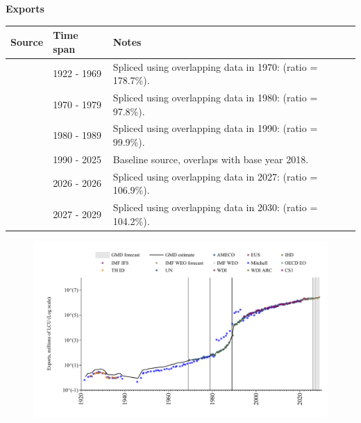 \documentclass[12pt,a4paper,landscape]{article}
\begin{document}
\begin{adjustbox}{max totalsize={\paperwidth}{\paperheight},center}
\begin{minipage}[t][\textheight][t]{\textwidth}
\vspace*{0.5cm}
{}
\begin{center}
{\Large\bfseries Exports}
\end{center}
\vspace{0.5cm}
\begin{table}[H]
\centering
\small
\begin{tabular}{|l|l|l|}
\hline
\textbf{Source} & \textbf{Time span} & \textbf{Notes} \\
\hline
\rowcolor{white}\cite{Mitchell}& 1922 - 1969 &Spliced using overlapping data in 1970: (ratio = 178.7\%). \\
\rowcolor{lightgray}\cite{UN}& 1970 - 1979 &Spliced using overlapping data in 1980: (ratio = 97.8\%). \\
\rowcolor{white}\cite{AMECO}& 1980 - 1989 &Spliced using overlapping data in 1990: (ratio = 99.9\%). \\
\rowcolor{lightgray}\cite{OECD_EO}& 1990 - 2025 &Baseline source, overlaps with base year 2018. \\
\rowcolor{white}\cite{AMECO}& 2026 - 2026 &Spliced using overlapping data in 2027: (ratio = 106.9\%). \\
\rowcolor{lightgray}\cite{IMF_WEO_forecast}& 2027 - 2029 &Spliced using overlapping data in 2030: (ratio = 104.2\%). \\
\hline
\end{tabular}
\end{table}
\begin{figure}[H]
\centering
\includegraphics[width=\textwidth,height=0.6\textheight,keepaspectratio]{graphs/POL_exports.pdf}
\end{figure}
\end{minipage}
\end{adjustbox}
\end{document}

